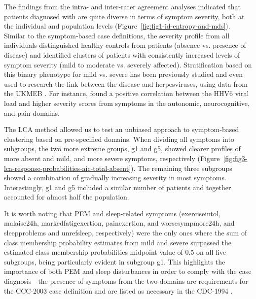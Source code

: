 The findings from the intra- and inter-rater agreement analyses indicated that patients diagnosed with \cfs are quite diverse in terms of symptom severity, both at the individual and population levels (Figure~\ref{fig:fig1-id-entropy-and-mds}).
Similar to the symptom-based case definitions, the severity profile from all individuals distinguished healthy controls from patients (absence vs. presence of disease) and identified clusters of patients with consistently increased levels of symptom severity (mild to moderate vs. severely affected).
Stratification based on this binary phenotype for mild vs. severe \cfs has been previously studied and even used to research the link between the disease and herpesviruses, using data from the UKMEB \citep{cliff2019CellularImmune, lee2021SalivaryDNA}.
For instance, \citet{lee2021SalivaryDNA} found a positive correlation between the HHV6 viral load and higher severity scores from symptoms in the autonomic, neurocognitive, and pain domains.

The LCA method allowed us to test an unbiased approach to symptom-based clustering based on pre-specified domains.
When dividing all symptoms into subgroups, the two more extreme groups, g1 and g5, showed clearer profiles of more absent and mild, and more severe symptoms, respectively (Figure~\ref{fig:fig3-lca-response-probabilities-aic-total-absent}).
The remaining three subgroups showed a combination of gradually increasing severity in most symptoms.
Interestingly, g1 and g5 included a similar number of patients and together accounted for almost half the \cfs population.

It is worth noting that PEM and sleep-related symptoms (exerciseintol, malaise24h, markedfatigexertion, painexertion, and worsesympmore24h, and sleepproblems and unrefsleep, respectively) were the only ones where the sum of class membership probability estimates from mild and severe surpassed the estimated class membership probabilities midpoint value of 0.5 on all five subgroups, being particularly evident in subgroup g1.
This highlights the importance of both PEM and sleep disturbances in order to comply with the case diagnosis---the presence of symptoms from the two domains are requirements for the CCC-2003 case definition and are listed as necessary in the CDC-1994 \citep{fukuda1994ChronicFatigue, carruthers2003MyalgicEncephalomyelitis}.

